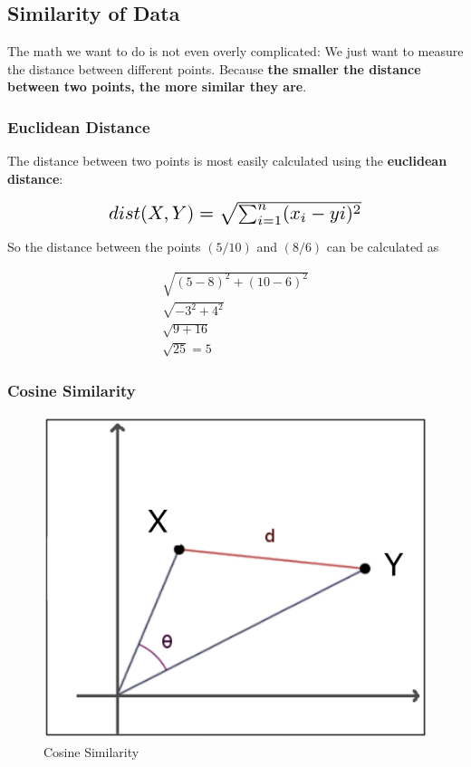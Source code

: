 \documentclass[a4paper, 11pt]{article}
\begin{document}
\newpage

\subsection{Similarity of Data}

The math we want to do is not even overly complicated: We just want to measure the distance between different points. Because \textbf{the smaller the distance between two points, the more similar they are}. 

\subsubsection{Euclidean Distance}

The distance between two points is most easily calculated using the \textbf{euclidean distance}:

\[\scalebox{1.5}{
        $dist(X,Y)= \sqrt{\sum^{n}_{i=1}(x_{i}-y{i})^2} $
}\]

So the distance between the points $(5/10)$ and $(8/6)$ can be calculated as

\begin{align*}
    \sqrt{(5-8)^2 + (10-6)^2} \\
    \sqrt{-3^2 + 4^2} \\
    \sqrt{9+16} \\ 
    \sqrt{25} = 5
\end{align*}

\newpage

\subsubsection{Cosine Similarity}

\begin{figure}
    \centering
    \includegraphics[keepaspectratio=true,height=14\baselineskip]{cosine_similarity.png}
    \caption{Cosine Similarity}
    \label{fig:cosine_similarity}
\end{figure}
\end{document}
